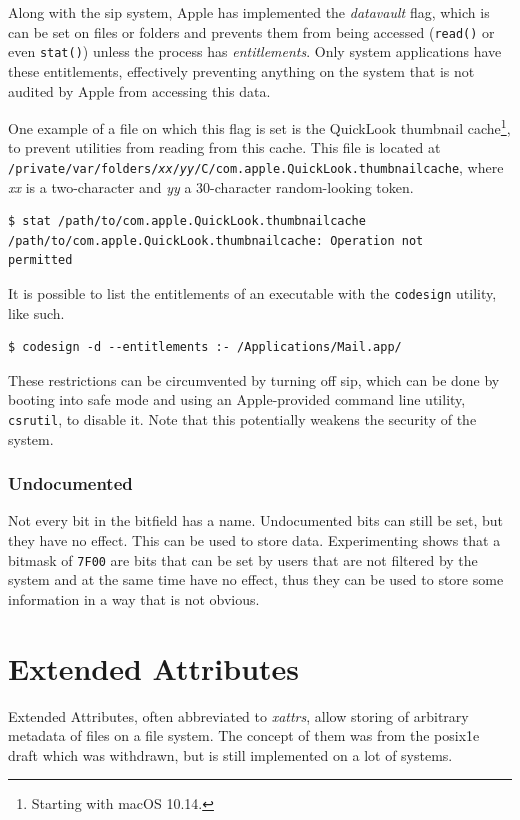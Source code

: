 \documentclass[a4paper]{article}
\begin{document}
Along with the \gls{sip} system, Apple has implemented the \emph{datavault} flag, which is can be set on files or folders and prevents them from being accessed (\verb|read()| or even \verb|stat()|) unless the process has \emph{entitlements}. Only system applications have these entitlements, effectively preventing anything on the system that is not audited by Apple from accessing this data.

One example of a file on which this flag is set is the QuickLook thumbnail cache\footnote{Starting with macOS 10.14.}, to prevent utilities from reading from this cache. This file is located at \texttt{/private/var/folders/\emph{xx}/\emph{yy}/C/com.apple.QuickLook.thumbnailcache}, where \emph{xx} is a two-character and \emph{yy} a 30-character random-looking token.

\begin{verbatim}
$ stat /path/to/com.apple.QuickLook.thumbnailcache
/path/to/com.apple.QuickLook.thumbnailcache: Operation not
permitted
\end{verbatim}
It is possible to list the entitlements of an executable with the \verb|codesign| utility, like such.

\begin{verbatim}
$ codesign -d --entitlements :- /Applications/Mail.app/
\end{verbatim}
These restrictions can be circumvented by turning off \gls{sip}, which can be done by booting into safe mode and using an Apple-provided command line utility, \verb|csrutil|, to disable it. Note that this potentially weakens the security of the system.

\subsubsection{Undocumented}

Not every bit in the bitfield has a name. Undocumented bits can still be set, but they have no effect. This can be used to store data. Experimenting shows that a bitmask of \verb|7F00| are bits that can be set by users that are not filtered by the system and at the same time have no effect, thus they can be used to store some information in a way that is not obvious.

\section{Extended Attributes}

Extended Attributes, often abbreviated to \emph{xattrs}, allow storing of arbitrary metadata of files on a file system. The concept of them was from the \gls{posix}\.1e draft which was withdrawn, but is still implemented on a lot of systems.
\end{document}
